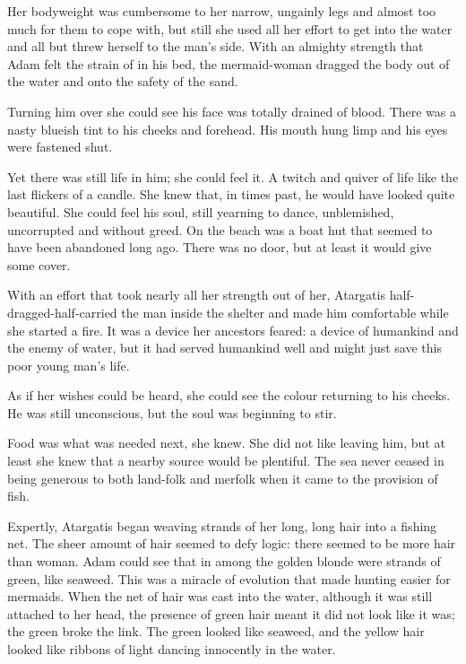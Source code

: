 Her bodyweight was cumbersome to her narrow, ungainly legs and almost
too much for them to cope with, but still she used all her effort to
get into the water and all but threw herself to the man’s side. With
an almighty strength that Adam felt the strain of in his bed, the
mermaid-woman dragged the body out of the water and onto the safety of
the sand.

Turning him over she could see his face was %
totally drained of
blood. There was a nasty blueish tint to his cheeks and forehead. His
mouth hung limp and his eyes were fastened shut.

Yet there was still life in him; she could feel it. A twitch and
quiver of life like the last flickers of a candle.
She knew that, in times past, he would have
looked quite beautiful. She could feel his soul,
still yearning to dance, unblemished, uncorrupted and without
greed.  On the beach was a boat hut that seemed to have been abandoned
long ago. There was no door, but at least it would give some cover.

With an effort that took nearly all her strength out of her, Atargatis
half-dragged-half-carried the man inside the shelter and made him
comfortable while she started a fire. It was a device her ancestors
feared: a device of humankind and the enemy of water, but it had
served humankind well and might just save this poor young man’s life.

As if her wishes could be heard, she could see the colour returning to
his cheeks. He was still unconscious, but the soul was beginning to
stir.

Food was what was needed next, she knew. She did not like leaving him,
but at least she knew that a nearby source would be plentiful. The sea
never ceased in being generous to both land-folk and merfolk when it
came to the provision of fish.

Expertly, Atargatis began weaving strands of her long, long hair into
a fishing net. The sheer amount of hair seemed to defy logic: 
there seemed to be more hair than woman. Adam could see that
in among the golden blonde were strands of green, like seaweed. This
was a miracle of evolution that made hunting easier for mermaids. When
the net of hair was cast into the water, although it was still
attached to her head, the presence of green hair meant it did not look
like it was; the green broke the link. The green looked like seaweed,
and the yellow hair looked like ribbons of light dancing innocently in
the water.

